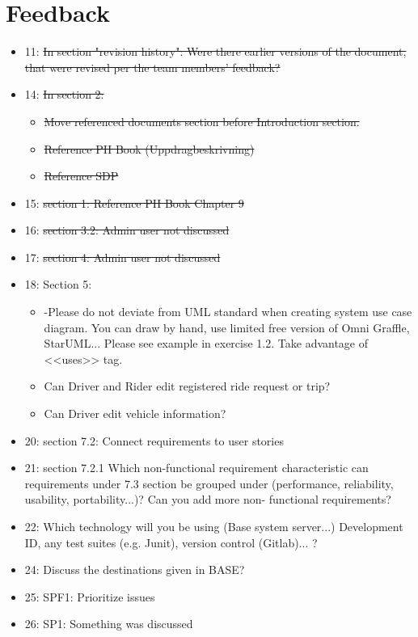 \documentclass{article}
\begin{document}
\section*{Feedback}
\begin{itemize}
    \item 11: \sout{In section "revision history": Were there earlier versions of the document, that were revised per the team members' feedback?}
    \item 14: \sout{In section 2:}
    \begin{itemize}
        \item \sout{Move referenced documents section before Introduction section.}
        \item \sout{Reference PH Book (Uppdragbeskrivning)}
        \item \sout{Reference SDP}
    \end{itemize}
    \item 15: \sout{section 1: Reference PH Book Chapter 9}
    \item 16: \sout{section 3.2: Admin user not discussed}
    \item 17: \sout{section 4: Admin user not discussed}
    \item 18: Section 5:
    \begin{itemize}
        \item -Please do not deviate from UML standard when creating system use case diagram. You can draw by hand, use limited free version of Omni Graffle, StarUML... Please see example in exercise 1.2. Take advantage of <<uses>> tag.
        \item Can Driver and Rider edit registered ride request or trip?
        \item Can Driver edit vehicle information?
    \end{itemize}
    \item 20: section 7.2: Connect requirements to user stories
    \item 21: section 7.2.1 Which non-functional requirement characteristic can requirements under 7.3 section be grouped under (performance, reliability, usability, portability...)? Can you add more non- functional requirements?
    \item 22: Which technology will you be using (Base system server...) Development ID, any test suites (e.g. Junit), version control (Gitlab)... ?
    \item 24: Discuss the destinations given in BASE?
    \item 25: SPF1: Prioritize issues
    \item 26: SP1: Something was discussed
\end{itemize}
\end{document}
